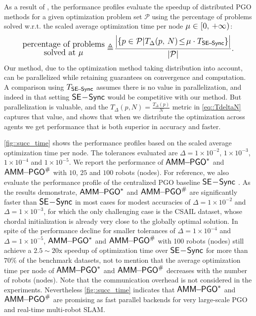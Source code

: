 As a result of \cite{dolan2002benchmarking}, the performance profiles evaluate the speedup of distributed PGO methods for a given optimization problem set $\mathcal{P}$ using  the percentage of problems solved w.r.t. the scaled average optimization time per node $\ratio\in[0,\,+\infty)$: 
\vspace{-0.25em}
\begin{equation}
	\nonumber
	\substack{\text{\normalsize percentage of problems}\\ \text{\normalsize  solved at $\ratio$}} \triangleq\! \frac{\big|\{p\in\mathcal{P}|T_{\Delta}(p,\,N)\!\leq\! \ratio\cdot T_{\sesync}\}\big|}{|\mathcal{P}|}.
\end{equation}
Our method, due to the optimization method taking distribution into account, can be parallelized while retaining guarantees on convergence and computation. A comparison using $T_{\sesync}$ assumes there is no value in parallelization, and indeed in that setting $\sesync$ would be competitive with our method. But parallelization is valuable, and the $T_{\Delta}(p,N)=\tfrac{T_\Delta(p)}{N}$ metric  in \cref{eq::TdeltaN} captures that value, and shows that when we distribute the optimization across agents we get performance that is both superior in accuracy and faster.

\cref{fig::succ_time} shows the performance profiles based on the scaled average optimization time per node. The tolerances evaluated are $\Delta=1\times10^{-2}$, $1\times10^{-3}$, $1\times10^{-4}$ and $1\times10^{-5}$. We report the performance of $\ammc$ and $\ammd$ with $10$, $25$ and $100$ robots (nodes). For reference, we also evaluate the performance profile of the centralized PGO baseline $\sesync$ \cite{rosen2016se}.  As the results demonstrate, $\ammc$ and $\ammd$ are significantly faster than $\sesync$ \cite{rosen2016se} in most cases for modest accuracies of $\Delta=1\times 10^{-2}$ and $\Delta=1\times 10^{-3}$, for which the only challenging case is the {\sf CSAIL} dataset, whose chordal initialization is already very close to the globally optimal solution.  In spite of the performance decline for smaller tolerances of $\Delta=1\times 10^{-4}$ and $\Delta=1\times 10^{-5}$, $\ammc$ and $\ammd$ with 100 robots (nodes) still achieve a $2.5\sim 20\mathrm{x}$ speedup of optimization time over $\sesync$ for more than $70\%$ of the benchmark datasets, not to mention that the average optimization time per node of $\ammc$ and $\ammd$ decreases with the number of robots (nodes). {\highlight Note that the communication overhead is not considered in the experiments.} Nevertheless  \cref{fig::succ_time} indicates that $\ammc$ and $\ammd$ are promising  as fast parallel backends for very large-scale PGO and real-time multi-robot SLAM.


